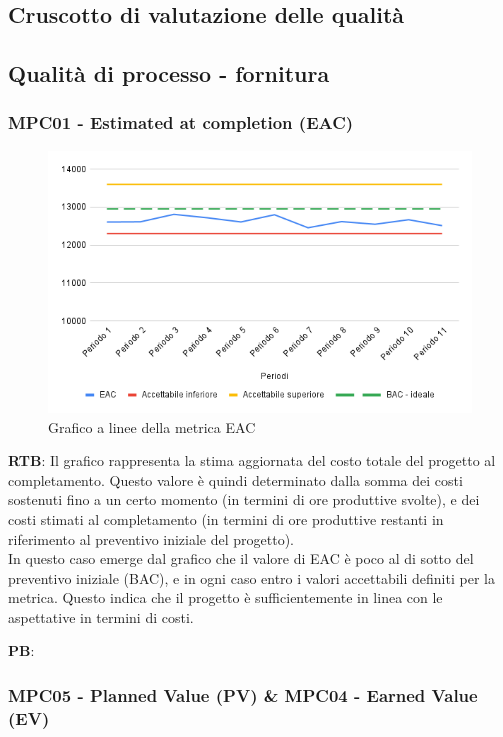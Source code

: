\documentclass[10pt]{article}
\begin{document}
\begin{justify}
\section{Cruscotto di valutazione delle qualità}
\label{sec:cruscotto}
\subsection{Qualità di processo - fornitura}
\label{sec:QdP_fornitura}
\subsubsection{MPC01 - Estimated at completion (EAC)}%

\begin{figure}[H]
  \centering
  \includegraphics[width=0.9\linewidth]{EAC.png}
  \caption{Grafico a linee della metrica EAC}
  \label{fig:EACchart}
\end{figure}


\textbf{RTB}: Il grafico rappresenta la stima aggiornata del costo totale del progetto al completamento. Questo valore è quindi determinato dalla somma 
dei costi sostenuti fino a un certo momento (in termini di ore produttive svolte), e dei costi stimati al completamento (in termini di ore produttive 
restanti in riferimento al preventivo iniziale del progetto).\\ 
In questo caso emerge dal grafico che il valore di EAC è poco al di sotto del preventivo iniziale (BAC), e in ogni caso entro i valori accettabili definiti
per la metrica. Questo indica che il progetto è sufficientemente in linea con le aspettative in termini di costi.

\noindent
\textbf{PB}:


\subsubsection{MPC05 - Planned Value (PV) \& MPC04 - Earned Value (EV)}%


\end{justify}
\end{document}
